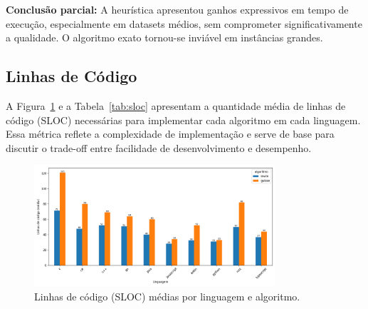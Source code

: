 \documentclass[12pt, a4paper]{article}
\begin{document}
\textbf{Conclusão parcial:} A heurística apresentou ganhos expressivos em tempo de execução, especialmente em datasets médios, sem comprometer significativamente a qualidade. O algoritmo exato tornou-se inviável em instâncias grandes.

\subsection{Linhas de Código}

A Figura~\ref{fig:sloc} e a Tabela~\ref{tab:sloc} apresentam a quantidade média de linhas de código (SLOC) necessárias para implementar cada algoritmo em cada linguagem. Essa métrica reflete a complexidade de implementação e serve de base para discutir o trade-off entre facilidade de desenvolvimento e desempenho.

\begin{figure}[H]
    \centering
    \includegraphics[width=0.8\textwidth]{img/linhas_codigo_linguagem_algoritmo.png}
    \caption{Linhas de código (SLOC) médias por linguagem e algoritmo.}
    \label{fig:sloc}
\end{figure}

\begin{table}[H]
    \centering
    \caption{Linhas de código (SLOC) médias por linguagem e algoritmo.}
    \label{tab:sloc}
\end{table}
\end{document}
